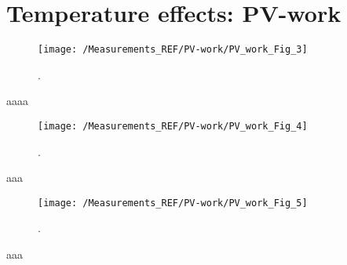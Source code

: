 \section{Temperature effects: PV-work}

\begin{figure}[ht]
	\centering
	\texttt{[image: /Measurements\_REF/PV-work/PV\_work\_Fig\_3]}
	\caption{.}
	\label{fig:PV_work_Fig_3}
\end{figure}
aaaa
\newpage
\noindent
\begin{figure}[ht]
	\centering
	\texttt{[image: /Measurements\_REF/PV-work/PV\_work\_Fig\_4]}
	\caption{.}
	\label{fig:PV_work_Fig_4}
\end{figure}
aaa
\newpage
\noindent
\begin{figure}[ht]
	\centering
	\texttt{[image: /Measurements\_REF/PV-work/PV\_work\_Fig\_5]}
	\caption{.}
	\label{fig:PV_work_Fig_5}
\end{figure}
aaa
\newpage
